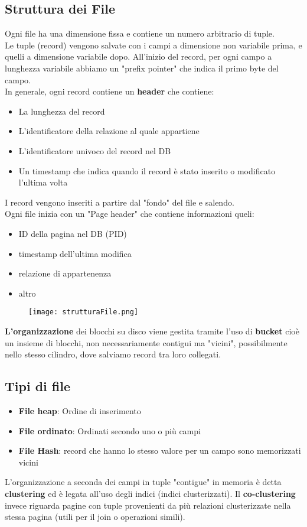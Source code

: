 \subsection{Struttura dei File}
Ogni file ha una dimensione fissa e contiene un numero arbitrario di tuple.\\
Le tuple (record) vengono salvate con i campi a dimensione non variabile prima, e quelli a dimensione variabile dopo. All'inizio del record, per ogni campo a lunghezza variabile abbiamo un "prefix pointer" che indica il primo byte del campo.\\
In generale, ogni record contiene un \textbf{header} che contiene:
\begin{itemize}
    \item La lunghezza del record
    \item L'identificatore della relazione al quale appartiene
    \item L'identificatore univoco del record nel DB
    \item Un timestamp che indica quando il record \`e stato inserito o modificato l'ultima volta
\end{itemize}
I record vengono inseriti a partire dal "fondo" del file e salendo.\\
Ogni file inizia con un "Page header" che contiene informazioni queli:
\begin{itemize}
    \item ID della pagina nel DB (PID)
    \item timestamp dell'ultima modifica
    \item relazione di appartenenza
    \item altro
\end{itemize}

\begin{figure}[h]
    \centering
    \texttt{[image: strutturaFile.png]}
    \label{fig:file}
\end{figure}

\noindent
\textbf{L'organizzazione} dei blocchi su disco viene gestita tramite l'uso di \textbf{bucket} cioè un insieme di blocchi, non necessariamente contigui ma "vicini", possibilmente nello stesso cilindro, dove salviamo record tra loro collegati.

\break
\subsection{Tipi di file}
\begin{itemize}
    \item \textbf{File heap}: Ordine di inserimento
    \item \textbf{File ordinato}: Ordinati secondo uno o più campi
    \item \textbf{File Hash}: record che hanno lo stesso valore per un campo sono memorizzati vicini
\end{itemize}
L'organizzazione a seconda dei campi in tuple "contigue" in memoria \`e detta \textbf{clustering} ed \`e legata all'uso degli indici (indici clusterizzati).
Il \textbf{co-clustering} invece riguarda pagine con tuple provenienti da più relazioni clusterizzate nella stessa pagina (utili per il join o operazioni simili).

